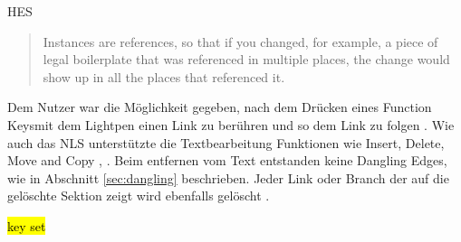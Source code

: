 \begin{section}{HES}
\begin{quote}
\glqq Instances are references, so that if you changed, for example, a piece of legal boilerplate that was referenced in multiple places, the change would show up in all the places that referenced it. \grqq{ }\cite{Dam1988}
\end{quote}

Dem Nutzer war die Möglichkeit gegeben, nach dem Drücken eines \glqq Function Keys\grqq{ }mit dem Lightpen einen Link zu berühren und so dem Link zu folgen \cite[S.23]{Dam1969}. Wie auch das NLS unterstützte die Textbearbeitung Funktionen wie Insert, Delete, Move and Copy \cite[S.10-14]{Dam1969}, \cite[S. 889]{Dam1988}. Beim entfernen vom Text entstanden keine Dangling Edges, wie in Abschnitt \ref{sec:dangling} beschrieben. Jeder Link oder Branch der auf die gelöschte Sektion zeigt wird ebenfalls gelöscht \cite[S.12]{Dam1969}.

\hl{key set}

\end{section}

